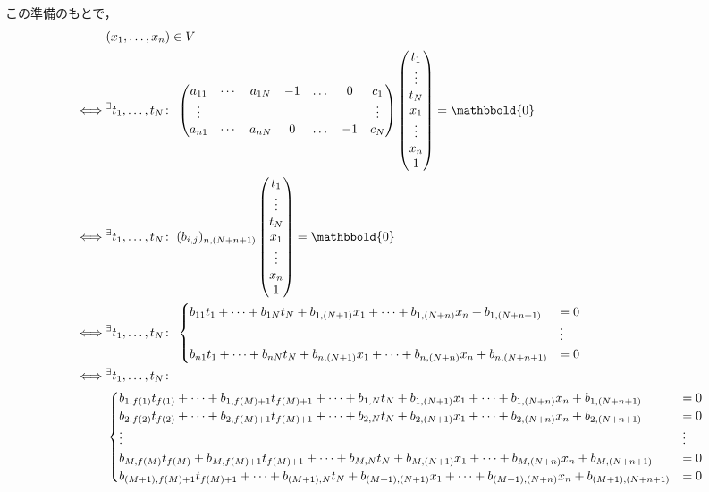 \documentclass[9pt]{ltjsarticle}
\newcommand{\bbold}{\mathbbold}
\theoremstyle{break}
\theoremstyle{break}
\theoremstyle{break}
\theoremstyle{break}
\theoremstyle{break}
\theoremstyle{break}
\theoremstyle{break}
\theoremstyle{break}
\theoremstyle{break}
\theoremstyle{break}
\theoremstyle{break}
\theoremstyle{break}
\theoremstyle{break}
\theoremstyle{break}
\theoremstyle{break}
\theoremstyle{nonumberbreak}
\theoremstyle{nonumberbreak}
\begin{document}
\begin{itemize}
この準備のもとで，
\begin{align}
& (x_1,\dots, x_n) \in V\\
\iff &
\Exists{t_1,\dots,t_N}
\begin{pmatrix}
 a_{11} & \cdots & a_{1N} & -1 & \dots & 0 & c_1\\
 \vdots& & & & & & \vdots\\
 a_{n1} & \cdots & a_{nN} & 0 & \dots & -1 & c_N
\end{pmatrix}
\tatev{t_1 \\ \vdots \\ t_N \\ x_1 \\ \vdots \\ x_n \\ 1}
 =
\bbold{0}\\
\iff &
\Exists{t_1,\dots,t_N} (b_{i,j})_{n,(N+n+1)}
 \tatev{t_1 \\ \vdots \\ t_N \\ x_1 \\ \vdots \\ x_n \\ 1}
 =
\bbold{0}\\
\iff &
\Exists{t_1,\dots,t_N}
\begin{cases}
 b_{11}t_1 + \dots + b_{1N}t_N + b_{1,(N+1)} x_1 + \dots + b_{1,(N+n)} x_n + b_{1,(N+n+1)} &= 0 \\
&\vdots\\
 b_{n1}t_1 + \dots + b_{nN}t_N + b_{n,(N+1)} x_1 + \dots + b_{n,(N+n)} x_n + b_{n,(N+n+1)} &= 0
\end{cases}\\
\iff &
\Exists{t_1,\dots,t_N} \\
&\begin{cases}
 b_{1,f(1)} t_{f(1)} + \dots + b_{1,f(M)+1}t_{f(M)+1} + \dots + b_{1,N}t_N + b_{1,(N+1)} x_1 + \dots + b_{1,(N+n)} x_n + b_{1,(N+n+1)} &= 0 \\
 b_{2,f(2)} t_{f(2)} + \dots + b_{2,f(M)+1}t_{f(M)+1} + \dots + b_{2,N}t_N + b_{2,(N+1)} x_1 + \dots + b_{2,(N+n)} x_n + b_{2,(N+n+1)} &= 0 \\
\vdots&\vdots \\
 b_{M,f(M)} t_{f(M)} +  b_{M,f(M)+1}t_{f(M)+1} + \dots + b_{M,N}t_N + b_{M,(N+1)} x_1 + \dots + b_{M,(N+n)} x_n + b_{M,(N+n+1)} &= 0 \\
b_{(M+1),f(M)+1}t_{f(M)+1} + \dots + b_{(M+1),N}t_N + b_{(M+1),(N+1)}x_1 + \dots + b_{(M+1),(N+n)}x_n + b_{(M+1),(N+n+1)} &= 0\\

\end{cases}
\end{align}
\end{itemize}
\end{document}
